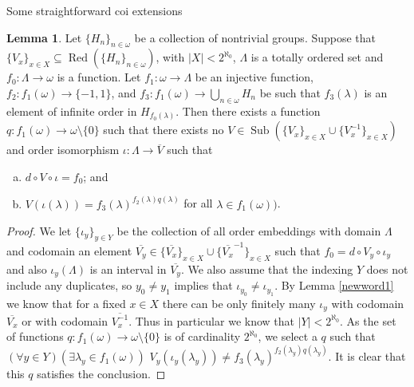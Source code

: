 \documentclass{amsart}
\theoremstyle{definition}\newtheorem{theorem}{Theorem}
\theoremstyle{definition}\newtheorem*{A}{Main Theorem}
\theoremstyle{definition}\newtheorem*{B}{Theorem \ref{elementaryequiv}}
\theoremstyle{definition}\newtheorem*{C}{Theorem \ref{continuous}}
\theoremstyle{definition}\newtheorem*{D}{Theorem \ref{bigisomorphism2}}
\theoremstyle{definition}\newtheorem{bigtheorem}{Main Theorem}
\numberwithin{theorem}{section}
\theoremstyle{definition}\newtheorem{corollary}[theorem]{Corollary}
\theoremstyle{definition}\newtheorem{proposition}[theorem]{Proposition}
\theoremstyle{definition}\newtheorem{definition}[theorem]{Definition}
\theoremstyle{definition}\newtheorem{question}[theorem]{Question}
\theoremstyle{definition}\newtheorem{example}[theorem]{Example}
\theoremstyle{definition}\newtheorem{remark}[theorem]{Remark}
\theoremstyle{definition}\newtheorem{note}[theorem]{Note}
\theoremstyle{definition}\newtheorem{lemma}[theorem]{Lemma}
\theoremstyle{definition}\newtheorem{fact}[theorem]{Fact}
\theoremstyle{definition}\newtheorem{define}[theorem]{Definition}
\theoremstyle{definition}\newtheorem{claim}[theorem]{Claim}
\theoremstyle{definition}\newtheorem{obs}[theorem]{Observation}
\theoremstyle{definition}\newtheorem{definitions}[theorem]{Definitions}
\newcommand{\Red}{\operatorname{Red}}
\newcommand{\Sub}{\operatorname{Sub}}
\begin{document}
\begin{section}{Some straightforward coi extensions}
\begin{lemma}\label{newword2}  Let $\{H_n\}_{n \in \omega}$ be a collection of nontrivial groups.  Suppose that $\{V_x\}_{x \in X} \subseteq \Red(\{H_n\}_{n \in \omega})$, with $|X| < 2^{\aleph_0}$, $\Lambda$ is a totally ordered set and $f_0: \Lambda \rightarrow \omega$ is a function.  Let $f_1: \omega \rightarrow \Lambda$ be an injective function, $f_2: f_1(\omega) \rightarrow \{-1, 1\}$, and $f_3: f_1(\omega) \rightarrow \bigcup_{n \in \omega} H_n$ be such that $f_3(\lambda)$ is an element of infinite order in $H_{f_0(\lambda)}$.  Then there exists a function $q: f_1(\omega) \rightarrow \omega \setminus \{0\}$ such that there exists no $V \in \Sub(\{V_x\}_{x \in X} \cup \{V_x^{-1}\}_{x\in X})$ and order isomorphism $\iota: \Lambda \rightarrow \overline{V}$ such that

\begin{enumerate}[(a)]

\item $d \circ V \circ \iota = f_0$; and

\item $V(\iota(\lambda)) = f_3(\lambda)^{f_2(\lambda)q(\lambda)}$ for all $\lambda \in f_1(\omega))$.
\end{enumerate}
\end{lemma}

\begin{proof}

We let $\{\iota_y\}_{y \in Y}$ be the collection of all order embeddings with domain $\Lambda$ and codomain an element $\overline{V_y} \in \{\overline{V_x}\}_{x \in X} \cup \{\overline{V_x}^{-1}\}_{x \in X}$ such that $f_0 = d \circ V_y \circ \iota_y$ and also $\iota_y(\Lambda)$ is an interval in $\overline{V_y}$.  We also assume that the indexing $Y$ does not include any duplicates, so $y_0 \neq y_1$ implies that $\iota_{y_0} \neq \iota_{y_1}$.  By Lemma \ref{newword1} we know that for a fixed $x\in X$ there can be only finitely many $\iota_y$ with codomain $\overline{V_x}$ or with codomain $\overline{V_x^{-1}}$.  Thus in particular we know that $|Y| < 2^{\aleph_0}$.  As the set of functions $q: f_1(\omega) \rightarrow \omega \setminus \{0\}$ is of cardinality $2^{\aleph_0}$, we select a $q$ such that $(\forall y \in Y)(\exists \lambda_y \in f_1(\omega))$  $V_y(\iota_y(\lambda_y)) \neq f_3(\lambda_y)^{f_2(\lambda_y)q(\lambda_y)}$.  It is clear that this $q$ satisfies the conclusion.
\end{proof}




\end{section}
\end{document}
